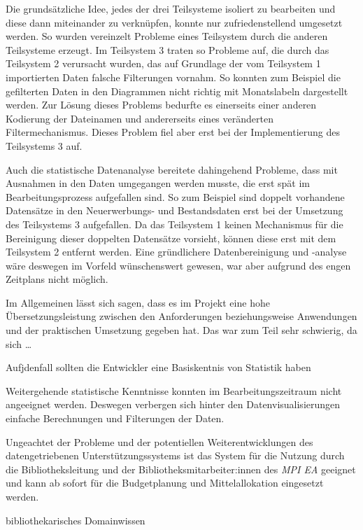 Die grundsätzliche Idee, jedes der drei Teilsysteme isoliert zu bearbeiten und diese dann miteinander zu verknüpfen, konnte nur zufriedenstellend umgesetzt werden.
So wurden vereinzelt Probleme eines Teilsystem durch die anderen Teilsysteme erzeugt. Im Teilsystem 3 traten so Probleme auf, die durch das Teilsystem 2 verursacht wurden, das auf Grundlage der 
vom Teilsystem 1 importierten Daten falsche Filterungen vornahm. So konnten zum Beispiel die gefilterten Daten in den Diagrammen nicht richtig mit Monatslabeln dargestellt werden. 
Zur Lösung dieses Problems bedurfte es einerseits einer anderen Kodierung der Dateinamen und andererseits eines veränderten Filtermechanismus. Dieses Problem fiel aber erst bei der Implementierung des Teilsystems 3 auf. 

Auch die statistische Datenanalyse bereitete dahingehend Probleme, dass mit Ausnahmen in den Daten umgegangen werden musste, die erst spät im Bearbeitungsprozess aufgefallen sind. 
So zum Beispiel sind doppelt vorhandene Datensätze in den Neuerwerbungs- und Bestandsdaten erst bei der Umsetzung des Teilsystems 3
aufgefallen. Da das Teilsystem 1 keinen Mechanismus für die Bereinigung dieser doppelten Datensätze vorsieht, können diese erst mit dem Teilsystem 2 entfernt werden.
Eine gründlichere Datenbereinigung und -analyse wäre deswegen im Vorfeld wünschenswert gewesen, war aber aufgrund des engen Zeitplans nicht möglich.


Im Allgemeinen lässt sich sagen, dass es im Projekt eine hohe Übersetzungsleistung zwischen den Anforderungen beziehungsweise Anwendungen und der praktischen Umsetzung gegeben hat.
Das war zum Teil sehr schwierig, da sich \dots

Aufjdenfall sollten die Entwickler eine Basiskentnis von Statistik haben


Weitergehende statistische Kenntnisse konnten im Bearbeitungszeitraum nicht angeeignet werden. Deswegen verbergen sich hinter den Datenvisualisierungen einfache Berechnungen und Filterungen der Daten.


Ungeachtet der Probleme und der potentiellen Weiterentwicklungen des datengetriebenen Unterstützungssystems ist das System für die Nutzung durch die Bibliotheksleitung und der Bibliotheksmitarbeiter:innen des \textit{\acrlong{MPI EA}} 
geeignet und kann ab sofort für die Budgetplanung und Mittelallokation eingesetzt werden.

bibliothekarisches Domainwissen
